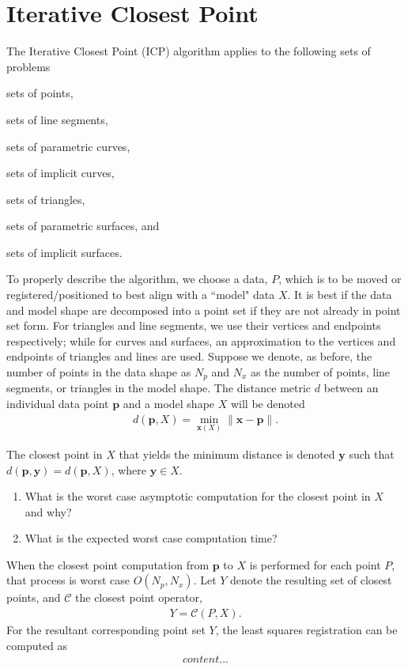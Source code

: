 \section{Iterative Closest Point}

The Iterative Closest Point (ICP) algorithm applies to the following sets of problems
%
\begin{inparaenum}[(i)]
	\item sets of points,
	\item sets of line segments,
	\item sets of parametric curves,
	\item sets of implicit curves,
	\item sets of triangles,
	\item sets of parametric surfaces, and
	\item sets of implicit surfaces.
\end{inparaenum}
%
To properly describe the algorithm, we choose a data, $P$, which is to be moved or registered/positioned to best align with a ``model" data $X$. It is best if the data and model shape are decomposed into a point set if they are not already in point set form. For triangles and line segments, we use their vertices and endpoints respectively; while for curves and surfaces, an approximation to the vertices and endpoints of triangles and lines are used. Suppose we denote, as before, the number of points in the data shape as $N_p$ and $N_x$ as the number of points, line segments, or triangles in the model shape. The distance metric $d$ between an individual data point $\bm{p}$ and a model shape $X$ will be denoted 
%
\begin{align}
	d(\bm{p}, X) = \min_{\bm{x}(X)} \|\bm{x} - \bm{p} \|.
\end{align}

The closest point in $X$ that yields the minimum distance is denoted $\bm{y}$ such that $d(\bm{p}, \bm{y}) = d(\bm{p}, X)$, where $\bm{y} \in X$.
%
\begin{quiz} 
	\begin{enumerate}
	\item What is the worst case asymptotic computation for the closest point in $X$ and why? %
	\item What is the expected worst case computation time?
	\end{enumerate}
\end{quiz}
%
When the closest point computation from $\bm{p}$ to $X$ is performed for each point $P$, that process is worst case $O(N_p, N_x)$. Let $Y$ denote the resulting set of closest points, and $\mathcal{C}$ the closest point operator, \ie 
%
\begin{align}
	Y = \mathcal{C}(P, X).
\end{align}
%
For the resultant corresponding point set $Y$, the least squares registration can be computed as
%
\begin{align}
	content...
\end{align}